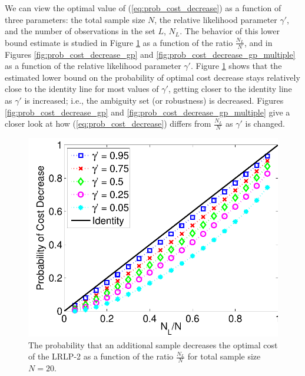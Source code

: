 \documentclass[11pt]{article}
\begin{document}
We can view the optimal value of (\ref{eq:prob_cost_decrease}) as a function of three parameters: the total sample size $N$, the relative likelihood parameter $\gamma'$, and the number of observations in the set $L$, $N_L$.
The behavior of this lower bound estimate is studied in Figure \ref{fig:prob_cost_decrease_nd_n} as a function of the ratio $\tfrac{N_L}{N}$, and in Figures \ref{fig:prob_cost_decrease_gp} and \ref{fig:prob_cost_decrease_gp_multiple} as a function of the relative likelihood parameter $\gamma'$.
Figure \ref{fig:prob_cost_decrease_nd_n} shows that the estimated lower bound on the probability of optimal cost decrease stays relatively close to the identity line for most values of $\gamma'$, getting closer to the identity line as  $\gamma'$ is increased; i.e., the ambiguity set (or robustness) is decreased.
Figures \ref{fig:prob_cost_decrease_gp} and \ref{fig:prob_cost_decrease_gp_multiple} give a closer look at how (\ref{eq:prob_cost_decrease}) differs from $\tfrac{N_L}{N}$ as $\gamma'$ is changed.

\begin{figure}
	\centering
	\includegraphics[width=.5\textwidth]{images/prob_dec_cost_v_nl_n_20}
	\caption{The probability that an additional sample decreases the optimal cost of the LRLP-2 as a function of the ratio $\frac{N_L}{N}$ for total sample size $N = 20$.}
	\label{fig:prob_cost_decrease_nd_n}
\end{figure}
\end{document}
